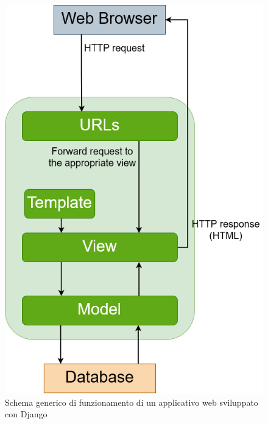 \newpage

\begin{figure}[ht!]
    \centering
	\includegraphics[scale=0.3]{images/Django_doc.png}
	\caption{Schema generico di funzionamento di un applicativo web sviluppato con Django}
	\label{fig:django_doc}
\end{figure}


